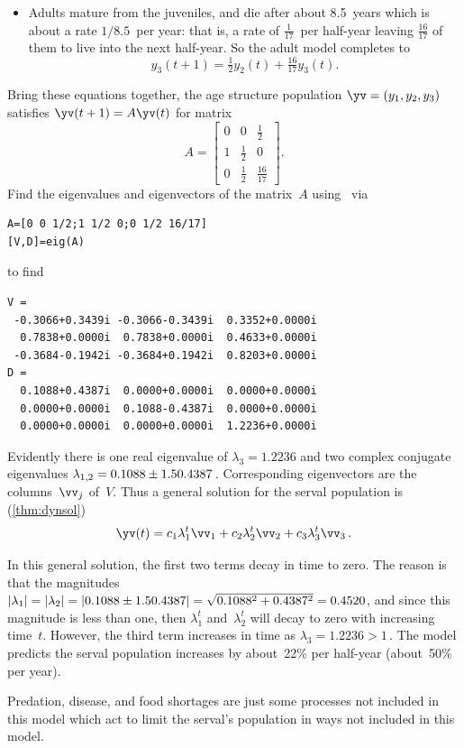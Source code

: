 \begin{example}
\begin{solution}
\begin{itemize}
\item Adults mature from the juveniles, and die after about 8.5~years which is about a rate \(1/8.5\)~per year: that is, a rate of \(\frac1{17}\)~per half-year leaving \(\tfrac{16}{17}\) of them to live into the next half-year.
So the adult model completes to 
\begin{equation*}
y_3(t+1)=\tfrac12y_2(t)+\tfrac{16}{17}y_3(t).
\end{equation*}

\end{itemize}

Bring these equations together, the age structure population \(\yv=(y_1,y_2,y_3)\) satisfies \(\yv(t+1)=A\yv(t)\) for matrix
\begin{equation*}
A=\begin{bmatrix} 0&0&\frac1{2}
\\1&\frac12&0
\\0&\frac12&\frac{16}{17} \end{bmatrix}.
\end{equation*}
Find the eigenvalues and eigenvectors of the matrix~\(A\) using \script\ via
\begin{verbatim}
A=[0 0 1/2;1 1/2 0;0 1/2 16/17]
[V,D]=eig(A)
\end{verbatim}
\setbox\ajrqrbox\hbox{}%
\marginajrbox%
to find
\begin{verbatim}
V =
 -0.3066+0.3439i -0.3066-0.3439i  0.3352+0.0000i
  0.7838+0.0000i  0.7838+0.0000i  0.4633+0.0000i
 -0.3684-0.1942i -0.3684+0.1942i  0.8203+0.0000i
D =
  0.1088+0.4387i  0.0000+0.0000i  0.0000+0.0000i
  0.0000+0.0000i  0.1088-0.4387i  0.0000+0.0000i
  0.0000+0.0000i  0.0000+0.0000i  1.2236+0.0000i
\end{verbatim}
Evidently there is one real eigenvalue of \(\lambda_3=1.2236\) and two complex conjugate eigenvalues \(\lambda_{1,2}=0.1088\pm 1.50.4387\)\,.
Corresponding eigenvectors are the columns~\(\vv_j\) of~\(V\).
Thus a general solution for the serval population is (\autoref{thm:dynsol})
\begin{equation*}
\yv(t)=c_1\lambda_1^t\vv_1+c_2\lambda_2^t\vv_2+c_3\lambda_3^t\vv_3\,.
\end{equation*}

In this general solution, the first two terms decay in time to zero.
The reason is that the magnitudes \(|\lambda_1|=|\lambda_2|=|0.1088\pm 1.50.4387|=\sqrt{0.1088^2+0.4387^2}=0.4520\), and since this magnitude is less than one, then \(\lambda_1^t\) and~\(\lambda_2^t\) will decay to zero with increasing time~\(t\).
However, the third term increases in time as \(\lambda_3=1.2236>1\)\,.
The model predicts the serval population increases by about~22\% per half-year (about~50\% per year).
\end{solution} 
Predation, disease, and food shortages are just some processes not included in this model which act to limit the serval's population in ways not included in this model.
\end{example}






